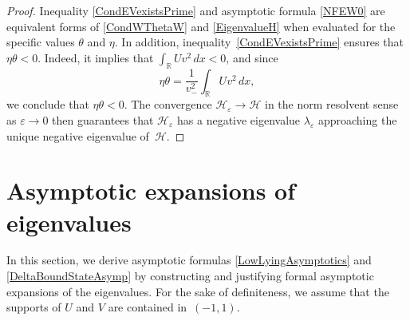 \documentclass[reqno]{amsart}
\theoremstyle{definition}
\theoremstyle{remark}
\numberwithin{equation}{section}
\newcommand{\Real}{\mathbb R}
\newcommand{\eps}{\varepsilon}
\newcommand{\cH}{\mathcal{H}}
\begin{document}
\begin{proof}
Inequality \eqref{CondEVexistsPrime} and asymptotic formula \eqref{NFEW0} are equivalent forms of \eqref{CondWThetaW} and \eqref{EigenvalueH} when evaluated for the specific values $\theta$ and $\eta$. In addition, inequality~\eqref{CondEVexistsPrime} ensures that $\eta\theta<0$. Indeed, it implies that $\int_\Real U v^2\,dx <0$, and since
\begin{equation*}
  \eta\theta=\frac{1}{v_-^2}\int_\Real U v^2\,dx,
\end{equation*}
we conclude that $\eta\theta < 0$. The convergence $\cH_\eps \to \cH$ in the norm resolvent sense as $\eps \to 0$ then guarantees that $\cH_\eps$ has a negative eigenvalue $\lambda_\eps$ approaching the unique negative eigenvalue of~$\cH$.
\end{proof}



\section{Asymptotic expansions of eigenvalues}
\label{sec:asymptotics}
In this section, we derive asymptotic formulas \eqref{LowLyingAsymptotics} and \eqref{DeltaBoundStateAsymp} by constructing and justifying formal asymptotic expansions of the eigenvalues. For the sake of definiteness, we assume that the supports of $U$ and $V$ are contained in~$(-1,1)$.
\end{document}

